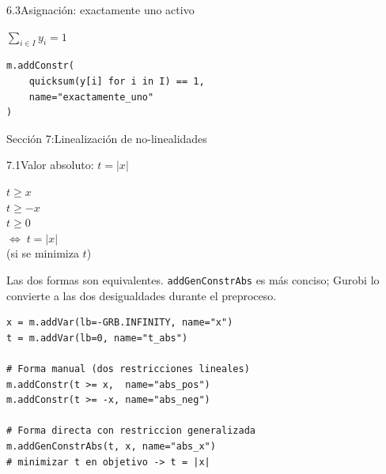 \documentclass[10pt,a4paper]{article}
\newlength{\mathcolw}
\newlength{\codecolw}
\newcommand{\secheader}[2]{%
  \vspace{10pt}%
  \needspace{6cm}%
  \noindent%
  \begin{tcolorbox}[
    colback=sectionbg, colupper=white,
    colframe=sectionbg, sharp corners,
    left=8pt, right=8pt, top=5pt, bottom=5pt,
    fontupper=\large\bfseries\sffamily,
  ]
  Secci\'on #1:\enspace #2
  \end{tcolorbox}%
  \vspace{2pt}%
}
\newcommand{\entryheader}[1]{%
  \needspace{5cm}%
  \vspace{6pt}%
  \noindent%
  \begin{tcolorbox}[
    colback=subsecbg!18,
    colframe=subsecbg!45,
    sharp corners, boxrule=0.4pt,
    left=5pt, right=5pt, top=2pt, bottom=2pt,
    fontupper=\small\bfseries\sffamily,
  ]
  #1
  \end{tcolorbox}%
  \vspace{2pt}%
}
\newcommand{\py}[1]{\texttt{\small #1}}
\begin{document}
\vspace{4pt}

\entryheader{6.3\quad Asignaci\'on: exactamente uno activo}
\noindent
\begin{minipage}[t]{\mathcolw}
    \begin{tcolorbox}[mathbox]
        $\displaystyle\sum_{i \in I} y_i = 1$
    \end{tcolorbox}
\end{minipage}\hspace{0.02\textwidth}%
\begin{minipage}[t]{\codecolw}
    \begin{lstlisting}[style=gurobipy]
m.addConstr(
    quicksum(y[i] for i in I) == 1,
    name="exactamente_uno"
)
\end{lstlisting}
\end{minipage}

\vspace{4pt}

\secheader{7}{Linealizaci\'on de no-linealidades}

\entryheader{7.1\quad Valor absoluto: $t = |x|$}
\noindent
\begin{minipage}[t]{\mathcolw}
    \begin{tcolorbox}[mathbox]
        $t \geq x$\\
        $t \geq -x$\\
        $t \geq 0$\\[4pt]
        $\Leftrightarrow\; t = |x|$\\(si se minimiza $t$)
    \end{tcolorbox}
    \vspace{2pt}
    \begin{tcolorbox}[notebox]
        Las dos formas son equivalentes. \py{addGenConstrAbs} es m\'as conciso; Gurobi lo convierte a las dos desigualdades durante el preproceso.
    \end{tcolorbox}
\end{minipage}\hspace{0.02\textwidth}%
\begin{minipage}[t]{\codecolw}
    \begin{lstlisting}[style=gurobipy]
x = m.addVar(lb=-GRB.INFINITY, name="x")
t = m.addVar(lb=0, name="t_abs")

# Forma manual (dos restricciones lineales)
m.addConstr(t >= x,  name="abs_pos")
m.addConstr(t >= -x, name="abs_neg")

# Forma directa con restriccion generalizada
m.addGenConstrAbs(t, x, name="abs_x")
# minimizar t en objetivo -> t = |x|
\end{lstlisting}
\end{minipage}
\end{document}
